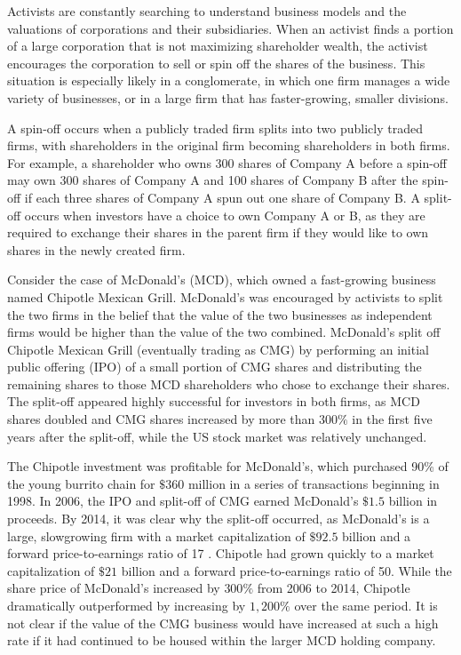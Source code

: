 \documentclass[11pt]{article}
\begin{document}
Activists are constantly searching to understand business models and the valuations of corporations and their subsidiaries. When an activist finds a portion of a large corporation that is not maximizing shareholder wealth, the activist encourages the corporation to sell or spin off the shares of the business. This situation is especially likely in a conglomerate, in which one firm manages a wide variety of businesses, or in a large firm that has faster-growing, smaller divisions.

A spin-off occurs when a publicly traded firm splits into two publicly traded firms, with shareholders in the original firm becoming shareholders in both firms. For example, a shareholder who owns 300 shares of Company A before a spin-off may own 300 shares of Company A and 100 shares of Company B after the spin-off if each three shares of Company A spun out one share of Company B. A split-off occurs when investors have a choice to own Company A or B, as they are required to exchange their shares in the parent firm if they would like to own shares in the newly created firm.

Consider the case of McDonald's (MCD), which owned a fast-growing business named Chipotle Mexican Grill. McDonald's was encouraged by activists to split the two firms in the belief that the value of the two businesses as independent firms would be higher than the value of the two combined. McDonald's split off Chipotle Mexican Grill (eventually trading as CMG) by performing an initial public offering (IPO) of a small portion of CMG shares and distributing the remaining shares to those MCD shareholders who chose to exchange their shares. The split-off appeared highly successful for investors in both firms, as MCD shares doubled and CMG shares increased by more than $300 \%$ in the first five years after the split-off, while the US stock market was relatively unchanged.

The Chipotle investment was profitable for McDonald's, which purchased 90\% of the young burrito chain for $\$ 360$ million in a series of transactions beginning in 1998. In 2006, the IPO and split-off of CMG earned McDonald's $\$ 1.5$ billion in proceeds. By 2014, it was clear why the split-off occurred, as McDonald's is a large, slowgrowing firm with a market capitalization of $\$ 92.5$ billion and a forward price-to-earnings ratio of 17 . Chipotle had grown quickly to a market capitalization of $\$ 21$ billion and a forward price-to-earnings ratio of 50. While the share price of McDonald's increased by $300 \%$ from 2006 to 2014, Chipotle dramatically outperformed by increasing by $1,200 \%$ over the same period. It is not clear if the value of the CMG business would have increased at such a high rate if it had continued to be housed within the larger MCD holding company.
\end{document}

